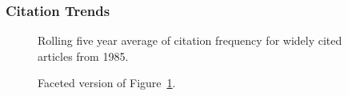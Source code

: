 \documentclass[
  10pt,
  letterpaper,
  DIV=11,
  numbers=noendperiod,
  twoside]{scrartcl}
\begin{document}
\subsubsection*{Citation Trends}\label{sec-trends-1985}

\begin{figure}


\caption{\label{fig-citation-spaghetti-1985}Rolling five year average of
citation frequency for widely cited articles from 1985.}

\end{figure}%

\begin{figure}


\caption{\label{fig-citation-facet-1985}Faceted version of
Figure~\ref{fig-citation-spaghetti-1985}.}

\end{figure}%
\end{document}
